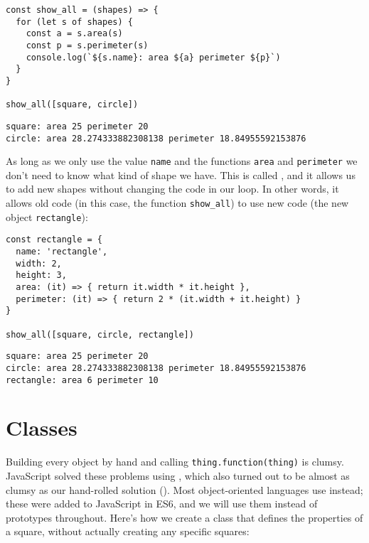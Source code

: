 \begin{verbatim}
const show_all = (shapes) => {
  for (let s of shapes) {
    const a = s.area(s)
    const p = s.perimeter(s)
    console.log(`${s.name}: area ${a} perimeter ${p}`)
  }
}

show_all([square, circle])
\end{verbatim}

\begin{verbatim}
square: area 25 perimeter 20
circle: area 28.274333882308138 perimeter 18.84955592153876
\end{verbatim}

As long as we only use the value \texttt{name} and the functions \texttt{area} and \texttt{perimeter}
we don't need to know what kind of shape we have.
This is called ,
and it allows us to add new shapes without changing the code in our loop.
In other words,
it allows old code (in this case, the function \texttt{show\_all})
to use new code (the new object \texttt{rectangle}):

\begin{verbatim}
const rectangle = {
  name: 'rectangle',
  width: 2,
  height: 3,
  area: (it) => { return it.width * it.height },
  perimeter: (it) => { return 2 * (it.width + it.height) }
}

show_all([square, circle, rectangle])
\end{verbatim}

\begin{verbatim}
square: area 25 perimeter 20
circle: area 28.274333882308138 perimeter 18.84955592153876
rectangle: area 6 perimeter 10
\end{verbatim}

\section{Classes}\label{s:oop-classes}

Building every object by hand and calling \texttt{thing.function(thing)} is clumsy.
JavaScript solved these problems using ,
which also turned out to be almost as clumsy as our hand-rolled solution ().
Most object-oriented languages use  instead;
these were added to JavaScript in ES6,
and we will use them instead of prototypes throughout.
Here's how we create a class that defines the properties of a square,
without actually creating any specific squares:

